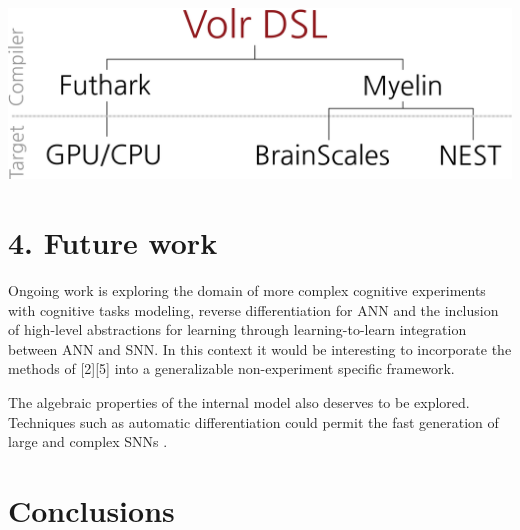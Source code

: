 \documentclass[a0,portrait]{a0poster}
\begin{document}
\begin{multicols}{2}
\begin{center}\vspace{1.3cm}
\includegraphics[width=0.9\linewidth]{volr_pipeline}
\label{fig:pipeline}
\end{center}

\section*{4. Future work}
Ongoing work is exploring the domain of more complex cognitive experiments with cognitive
tasks modeling, reverse differentiation for ANN and
the inclusion of high-level abstractions for learning through learning-to-learn integration between ANN and SNN. In
this context it would be interesting to incorporate the methods of [2][5] into a generalizable non-experiment specific
framework.

The algebraic properties of the internal model also deserves to be explored. Techniques
such as automatic differentiation could permit the fast generation of large and complex
SNNs \cite{Baydin2018}.


\color{SaddleBrown} %

\section*{Conclusions}


\end{multicols}
\end{document}
